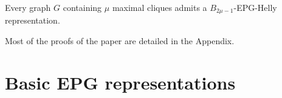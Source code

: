\documentclass[runningheads]{llncs}
\begin{document}
  
  
 
 
%   
 
 
 \begin{corollary}\label{cor:maxCliques}
 Every graph $G$ containing $\mu$ maximal cliques admits a $B_{2\mu -1}$-EPG-Helly representation. %
 \end{corollary}
 
Most of the proofs of the paper are detailed in the Appendix.
 
\section{Basic EPG representations}

\end{document}

